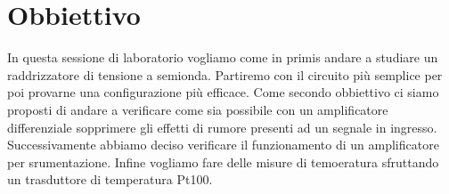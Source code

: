 \section*{Obbiettivo}

In questa sessione di laboratorio vogliamo come in primis andare a studiare un raddrizzatore di tensione a semionda. Partiremo con il circuito più semplice per poi provarne una configurazione più efficace.
Come secondo obbiettivo ci siamo proposti di andare a verificare come sia possibile con un amplificatore differenziale sopprimere gli effetti di rumore presenti ad un segnale in ingresso.
Successivamente abbiamo deciso verificare il funzionamento di un amplificatore per srumentazione.
Infine vogliamo fare delle misure di temoeratura sfruttando un trasduttore di temperatura Pt100.

